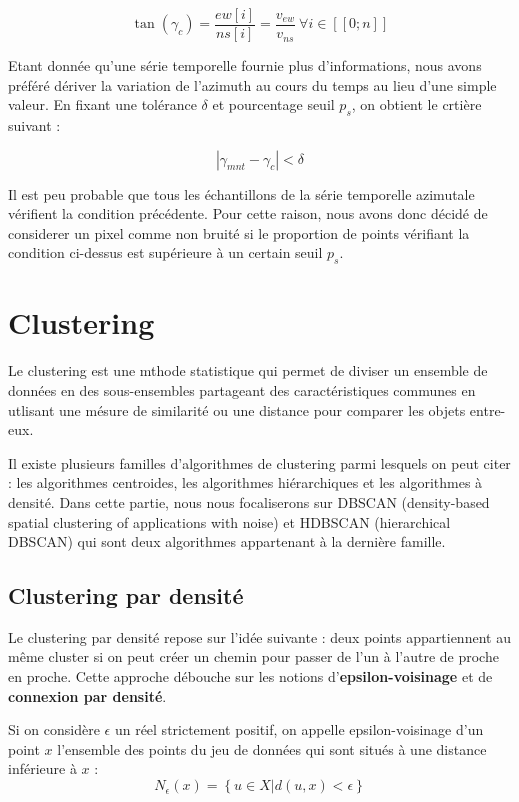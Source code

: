 \documentclass[11pt, openany]{report}
\begin{document}
\[ \tan \left(\gamma_c \right) = \dfrac{ew[i]}{ns[i]} = \dfrac{v_{ew}}{v_{ns}} \: \forall i \in  [\![0;n]\!]   \]

Etant donnée qu'une série temporelle fournie plus d'informations, nous avons préféré dériver la variation de l'azimuth au cours du temps au lieu d'une simple valeur. En fixant une tolérance $\delta$ et pourcentage seuil $p_s$, on obtient le crtière suivant :

\[ |\gamma_{mnt} - \gamma_{c}| < \delta   \]

Il est peu probable que tous les échantillons de la série temporelle azimutale vérifient la condition précédente. Pour cette raison, nous avons donc décidé de considerer un pixel comme non bruité si le proportion de points vérifiant la condition ci-dessus est supérieure à un certain seuil $p_s$.

\section{Clustering}
Le clustering est une mthode statistique qui permet de diviser un ensemble de données en des sous-ensembles partageant des caractéristiques communes en utlisant une mésure de similarité ou une distance pour comparer les objets entre-eux.

Il existe plusieurs familles d'algorithmes de clustering parmi lesquels on peut citer : les  algorithmes centroides, les algorithmes hiérarchiques et les algorithmes à densité. Dans cette partie, nous nous focaliserons sur DBSCAN (density-based  spatial clustering of applications with noise) et HDBSCAN (hierarchical DBSCAN) qui sont deux algorithmes appartenant à la dernière famille.

\subsection{Clustering par densité}
Le clustering par densité repose sur l'idée suivante : deux points appartiennent au même cluster si on peut créer un chemin pour passer de l'un à l'autre de proche en proche. Cette approche débouche sur les notions d'\textbf{epsilon-voisinage} et de \textbf{connexion par densité}.

Si on considère $\epsilon$ un réel strictement positif, on appelle epsilon-voisinage d'un point $x$ l'ensemble des points du jeu de données qui sont situés à une distance inférieure à $x$ :
\[ {N_{\epsilon}}\left(x\right) = \left\lbrace u \in X | d(u,x) < \epsilon \right\rbrace  \]
\end{document}
